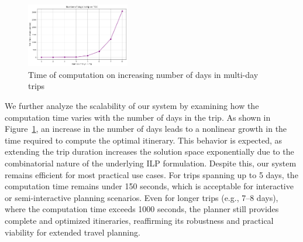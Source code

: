 \begin{figure}[H]
    \includegraphics[width=0.4\textwidth]{plots/multidayVStoc.png}
     \caption{Time of computation on increasing number of days in multi-day trips}
    \label{fig:scalability2}
\end{figure}
We further analyze the scalability of our system by examining how the computation time varies with the number of days in the trip. As shown in Figure~\ref{fig:scalability2}, an increase in the number of days leads to a nonlinear growth in the time required to compute the optimal itinerary. This behavior is expected, as extending the trip duration increases the solution space exponentially due to the combinatorial nature of the underlying ILP formulation. Despite this, our system remains efficient for most practical use cases. For trips spanning up to 5 days, the computation time remains under 150 seconds, which is acceptable for interactive or semi-interactive planning scenarios. Even for longer trips (e.g., 7–8 days), where the computation time exceeds 1000 seconds, the planner still provides complete and optimized itineraries, reaffirming its robustness and practical viability for extended travel planning.




